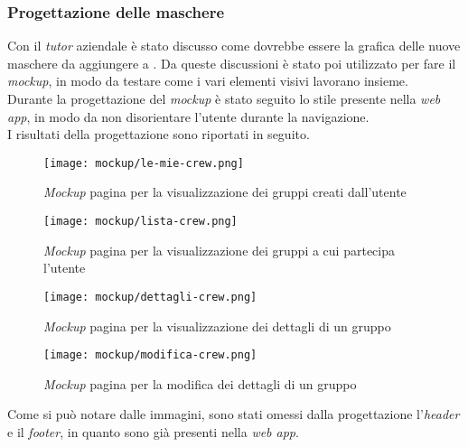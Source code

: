 \subsubsection{Progettazione delle maschere}
Con il \textit{tutor} aziendale è stato discusso come dovrebbe essere la grafica delle nuove maschere da aggiungere a \productName. Da queste discussioni è stato poi utilizzato  per fare il \textit{mockup}, in modo da  testare come i vari elementi visivi lavorano insieme.\\
Durante la progettazione del \textit{mockup} è stato seguito lo stile presente nella \textit{web app}, in modo da non disorientare l'utente durante la navigazione. \\
I risultati della progettazione sono riportati in seguito.
\begin{figure}[H] 
    \centerline{\texttt{[image: mockup/le-mie-crew.png]}} 
    \caption{\textit{Mockup} pagina per la visualizzazione dei gruppi creati dall'utente}
\end{figure}

\begin{figure}[H] 
    \centering 
    \texttt{[image: mockup/lista-crew.png]} 
    \caption{\textit{Mockup} pagina per la visualizzazione dei gruppi a cui partecipa l'utente}
\end{figure}

\begin{figure}[H] 
    \centering 
    \texttt{[image: mockup/dettagli-crew.png]} 
    \caption{\textit{Mockup} pagina per la visualizzazione dei dettagli di un gruppo}
\end{figure}

\begin{figure}[H] 
    \centering 
    \texttt{[image: mockup/modifica-crew.png]} 
    \caption{\textit{Mockup} pagina per la modifica dei dettagli di un gruppo}
\end{figure}

Come si può notare dalle immagini, sono stati omessi dalla progettazione l'\textit{header} e il \textit{footer}, in quanto sono già presenti nella \textit{web app}.





